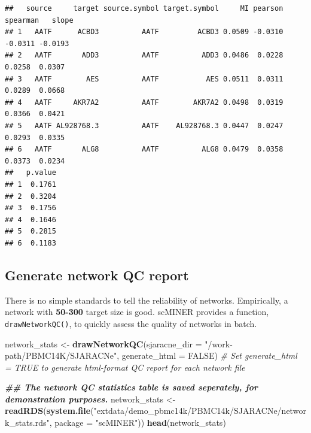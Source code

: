 \documentclass[
  12pt,
]{book}
\newenvironment{Shaded}{\begin{snugshade}}{\end{snugshade}}
\newcommand{\AttributeTok}[1]{\textcolor[rgb]{0.13,0.29,0.53}{#1}}
\newcommand{\CommentTok}[1]{\textcolor[rgb]{0.56,0.35,0.01}{\textit{#1}}}
\newcommand{\ConstantTok}[1]{\textcolor[rgb]{0.56,0.35,0.01}{#1}}
\newcommand{\DocumentationTok}[1]{\textcolor[rgb]{0.56,0.35,0.01}{\textbf{\textit{#1}}}}
\newcommand{\FunctionTok}[1]{\textcolor[rgb]{0.13,0.29,0.53}{\textbf{#1}}}
\newcommand{\NormalTok}[1]{#1}
\newcommand{\OtherTok}[1]{\textcolor[rgb]{0.56,0.35,0.01}{#1}}
\newcommand{\StringTok}[1]{\textcolor[rgb]{0.31,0.60,0.02}{#1}}
\begin{document}
\begin{verbatim}
##   source     target source.symbol target.symbol     MI pearson spearman   slope
## 1   AATF      ACBD3          AATF         ACBD3 0.0509 -0.0310  -0.0311 -0.0193
## 2   AATF       ADD3          AATF          ADD3 0.0486  0.0228   0.0258  0.0307
## 3   AATF        AES          AATF           AES 0.0511  0.0311   0.0289  0.0668
## 4   AATF     AKR7A2          AATF        AKR7A2 0.0498  0.0319   0.0366  0.0421
## 5   AATF AL928768.3          AATF    AL928768.3 0.0447  0.0247   0.0293  0.0335
## 6   AATF       ALG8          AATF          ALG8 0.0479  0.0358   0.0373  0.0234
##   p.value
## 1  0.1761
## 2  0.3204
## 3  0.1756
## 4  0.1646
## 5  0.2815
## 6  0.1183
\end{verbatim}

\subsection{Generate network QC report}\label{generate-network-qc-report}

There is no simple standards to tell the reliability of networks. Empirically, a network with \textbf{50-300} target size is good. scMINER provides a function, \texttt{drawNetworkQC()}, to quickly assess the quality of networks in batch.

\begin{Shaded}
\begin{Highlighting}[]
\NormalTok{network\_stats }\OtherTok{\textless{}{-}} \FunctionTok{drawNetworkQC}\NormalTok{(}\AttributeTok{sjaracne\_dir =} \StringTok{"/work{-}path/PBMC14K/SJARACNe"}\NormalTok{, }\AttributeTok{generate\_html =} \ConstantTok{FALSE}\NormalTok{) }\CommentTok{\# Set \textasciigrave{}generate\_html = TRUE\textasciigrave{} to generate html{-}format QC report for each network file}
\end{Highlighting}
\end{Shaded}

\begin{Shaded}
\begin{Highlighting}[]
\DocumentationTok{\#\# The network QC statistics table is saved seperately, for demonstration purposes.}
\NormalTok{network\_stats }\OtherTok{\textless{}{-}} \FunctionTok{readRDS}\NormalTok{(}\FunctionTok{system.file}\NormalTok{(}\StringTok{"extdata/demo\_pbmc14k/PBMC14k/SJARACNe/network\_stats.rds"}\NormalTok{, }\AttributeTok{package =} \StringTok{"scMINER"}\NormalTok{))}
\FunctionTok{head}\NormalTok{(network\_stats)}
\end{Highlighting}
\end{Shaded}
\end{document}
